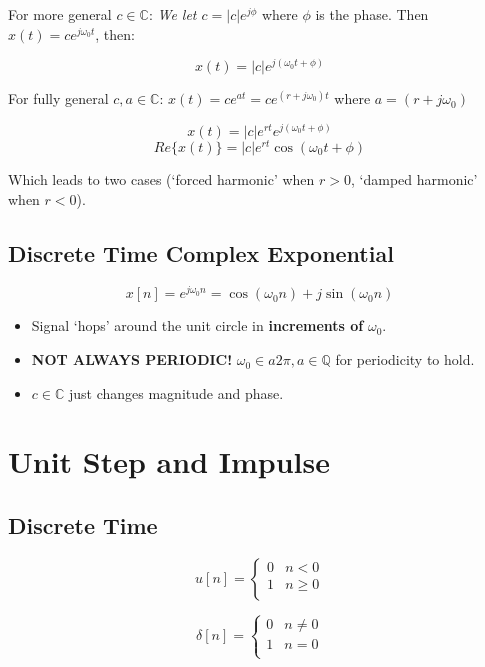 \documentclass[a4paper,12pt]{report}
\begin{document}
For more general $c\in\mathbb{C}$: \textit{We let $c = |c|e^{j\phi}$} where $\phi$ is the phase. Then $x(t) = ce^{j\omega_0 t}$, then: 

$$x(t) = |c|e^{j(\omega_0 t + \phi)}$$

For fully general $c, a \in \mathbb{C}$: $x(t) = ce^{at} = ce^{(r+j\omega_0)t}$ where $a = (r+j\omega_0)$

$$x(t) = |c|e^{rt} e^{j(\omega_0 t + \phi)}$$
$$Re\{x(t)\} = |c|e^{rt} \cos(\omega_0 t + \phi)$$

Which leads to two cases (`forced harmonic' when $r>0$, `damped harmonic' when $r < 0$).

\subsection{Discrete Time Complex Exponential} 

$$x[n] = e^{j\omega_0 n} = \cos(\omega_0 n) + j\sin(\omega_0 n)$$

\begin{itemize}
\item Signal `hops' around the unit circle in \textbf{increments of} $\omega_0$.
\item \textbf{NOT ALWAYS PERIODIC!} $\omega_0 \in a2\pi, a\in \mathbb{Q}$ for periodicity to hold.
\item $c\in\mathbb{C}$ just changes magnitude and phase.
\end{itemize}

\section{Unit Step and Impulse}

\subsection{Discrete Time}

\begin{equation}
	u[n] = 
	\begin{cases}
		0 & n < 0 \\
		1 & n \geq 0 \\
	\end{cases}
\end{equation}

\begin{equation}
	\delta[n] = 
	\begin{cases}
		0 & n \neq 0 \\
		1 & n = 0 \\
	\end{cases}
\end{equation}
\end{document}
